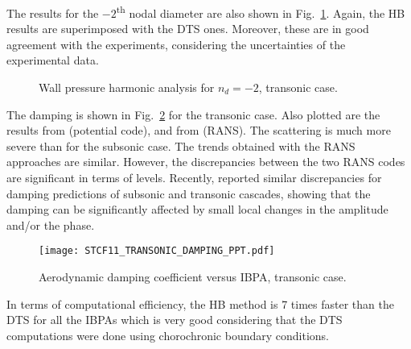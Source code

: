 The results for the $-2$\textsuperscript{th} nodal diameter are also shown in
Fig.~\ref{fig:stcf11_ael_transonic_ibpa_324_paper}. Again,
the HB results are superimposed with the DTS ones. Moreover, these are in
good agreement with the experiments, considering the uncertainties of
the experimental data.
\begin{figure}[htp]
  \centering
  \caption{Wall pressure harmonic analysis for \mbox{$n_d=-2$}, transonic case.}
  \label{fig:stcf11_ael_transonic_ibpa_324_paper}
\end{figure}

The damping is shown in Fig.~\ref{fig:stcf11_transonic_damping} for
the transonic case. Also plotted are the results from
\citet{Fransson1999} (potential code), and 
from \citet{Cinnella2004} (RANS). The scattering is much more severe
than for the subsonic case. The trends obtained with the RANS approaches are similar. However, the
discrepancies between the two RANS codes are significant in terms of
levels.
Recently, \citet{Vogt2011} reported similar discrepancies 
for damping predictions of subsonic and transonic cascades, 
showing that the damping can be significantly affected by 
small local changes in the amplitude and/or the phase.
\begin{figure}[htp]
  \centering
  \texttt{[image: STCF11\_TRANSONIC\_DAMPING\_PPT.pdf]}
  \caption{Aerodynamic damping coefficient versus IBPA, transonic case.}
  \label{fig:stcf11_transonic_damping}
\end{figure}
In terms of computational efficiency, the HB method is 7 times faster
than the DTS for all the IBPAs which is very good considering 
that the DTS computations
were done using chorochronic boundary conditions.